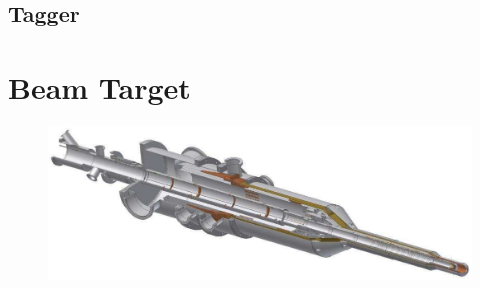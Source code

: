 \subsection{Tagger}
\label{subsec:tag}
\section{Beam Target}

\begin{figure}[htbp]
	\centering
	\includegraphics[width=.5\linewidth]{figs/Target.pdf}
	\caption{\cite{cb}}
\end{figure}
